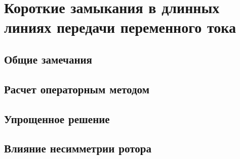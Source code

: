 \chapter{Короткие замыкания в длинных линиях передачи переменного тока}
\label{chap:18}

\section{Общие замечания}
\label{sec:18-1}


\section{Расчет операторным методом}
\label{sec:18-2}


\section{Упрощенное решение}
\label{sec:18-3}


\section{Влияние несимметрии ротора}
\label{sec:18-4}